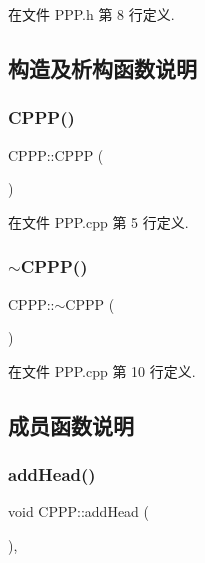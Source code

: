 在文件 P\+P\+P.\+h 第 8 行定义.



\subsection{构造及析构函数说明}
\mbox{\label{class_c_p_p_p_acab476d358d55a9e8bf1618019228566}} 
\subsubsection{\texorpdfstring{C\+P\+P\+P()}{CPPP()}}
{\footnotesize\ttfamily C\+P\+P\+P\+::\+C\+P\+PP (\begin{DoxyParamCaption}{ }\end{DoxyParamCaption})}



在文件 P\+P\+P.\+cpp 第 5 行定义.

\mbox{\label{class_c_p_p_p_a27c924df735ade52f06207dcccdea395}} 
\subsubsection{\texorpdfstring{$\sim$\+C\+P\+P\+P()}{~CPPP()}}
{\footnotesize\ttfamily C\+P\+P\+P\+::$\sim$\+C\+P\+PP (\begin{DoxyParamCaption}{ }\end{DoxyParamCaption})}



在文件 P\+P\+P.\+cpp 第 10 行定义.



\subsection{成员函数说明}
\mbox{\label{class_c_p_p_p_aba6a014532e6d329cf1f8dfb591eff72}} 
\subsubsection{\texorpdfstring{add\+Head()}{addHead()}}
{\footnotesize\ttfamily void C\+P\+P\+P\+::add\+Head (\begin{DoxyParamCaption}{ }\end{DoxyParamCaption})\hspace{0.3cm}{\ttfamily [protected]}, {\ttfamily [virtual]}}



